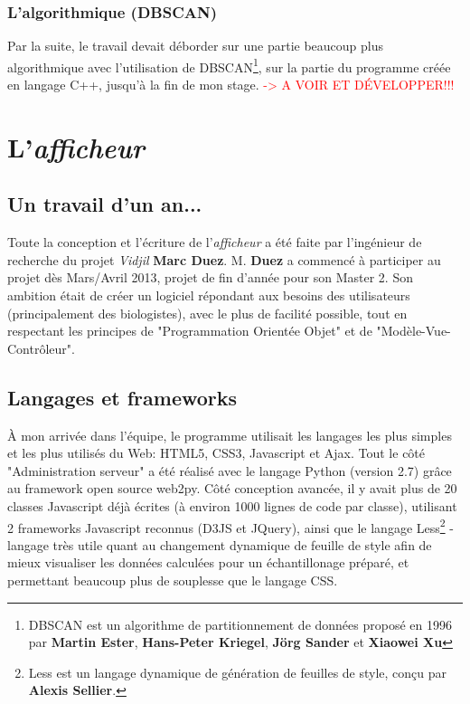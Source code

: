 \documentclass{report}
\begin{document}
\subsection{L'algorithmique (DBSCAN)}
Par la suite, le travail devait déborder sur une partie beaucoup plus algorithmique avec l'utilisation de DBSCAN\footnote{DBSCAN est un algorithme de partitionnement de données proposé en 1996 par \textbf{Martin Ester}, \textbf{Hans-Peter Kriegel}, \textbf{Jörg Sander} et \textbf{Xiaowei Xu}}, sur la partie du programme créée en langage C++, jusqu'à la fin de mon stage.
\newline
\textcolor{red}{-> A VOIR ET DÉVELOPPER!!!}


\chapter{L'\textit{afficheur}}

\section{Un travail d'un an...}
Toute la conception et l'écriture de l'\textit{afficheur} a été faite par l'ingénieur de recherche du projet \textit{Vidjil} \textbf{Marc Duez}.
\newline
M. \textbf{Duez} a commencé à participer au projet dès Mars/Avril 2013, projet de fin d'année pour son Master 2.
\newline
Son ambition était de créer un logiciel répondant aux besoins des utilisateurs (principalement des biologistes), avec le plus de facilité possible, tout en respectant les principes de "Programmation Orientée Objet" et de "Modèle-Vue-Contrôleur".

\section{Langages et frameworks}
À mon arrivée dans l'équipe, le programme utilisait les langages les plus simples et les plus utilisés du Web: HTML5, CSS3, Javascript et Ajax.
\newline
Tout le côté "Administration serveur" a été réalisé avec le langage Python (version 2.7) grâce au framework open source web2py.
\newline
Côté conception avancée, il y avait plus de 20 classes Javascript déjà écrites (à environ 1000 lignes de code par classe), utilisant 2 frameworks Javascript reconnus (D3JS et JQuery), ainsi que le langage Less\footnote{Less est un langage dynamique de génération de feuilles de style, conçu par \textbf{Alexis Sellier}.} - langage très utile quant au changement dynamique de feuille de style afin de mieux visualiser les données calculées pour un échantillonage préparé, et permettant beaucoup plus de souplesse que le langage CSS.
\end{document}
